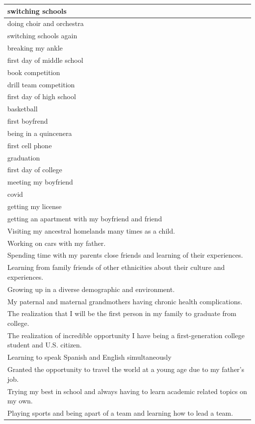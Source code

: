 \documentclass[
  .7em,
  letterpaper,
  DIV=11,
  numbers=noendperiod]{scrartcl}
\begin{document}
\begin{table}
\begin{tabular}{l}
switching schools\\
\hline
doing choir and orchestra\\
\hline
switching schools again\\
\hline
breaking my ankle\\
\hline
first day of middle school\\
\hline
book competition\\
\hline
drill team competition\\
\hline
first day of high school\\
\hline
basketball\\
\hline
first boyfrend\\
\hline
being in a quincenera\\
\hline
first cell phone\\
\hline
graduation\\
\hline
first day of college\\
\hline
meeting my boyfriend\\
\hline
covid\\
\hline
getting my license\\
\hline
getting an apartment with my boyfriend and friend\\
\hline
Visiting my ancestral homelands many times as a child.\\
\hline
Working on cars with my father.\\
\hline
Spending time with my parents close friends and learning of their experiences.\\
\hline
Learning from family friends of other ethnicities about their culture and experiences.\\
\hline
Growing up in a diverse demographic and environment.\\
\hline
My paternal and maternal grandmothers having chronic health complications.\\
\hline
The realization that I will be the first person in my family to graduate from college.\\
\hline
The realization of incredible opportunity I have being a first-generation college student and U.S. citizen.\\
\hline
Learning to speak Spanish and English simultaneously\\
\hline
Granted the opportunity to travel the world at a young age due to my father's job.\\
\hline
Trying my best in school and always having to learn academic related topics on my own.\\
\hline
Playing sports and being apart of a team and learning how to lead a team.\\

\end{tabular}
\end{table}
\end{document}
